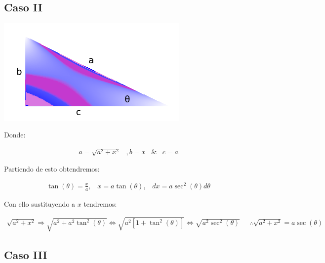 \subsection{Caso II}

\begin{center}
  \includegraphics[scale=0.5]{imgsAux/triangulo1.png}\\
\end{center}

Donde:

\begin{equation*}
    \begin{gathered}
        a=\sqrt{a^{2}+x^{2}}\;\;\;, b=x \;\;\;\&\;\;\; c=a
    \end{gathered}
\end{equation*}

Partiendo de esto obtendremos:

\begin{equation*}
    \begin{gathered}
        \tan(\theta)= \frac{x}{a},\;\;\; x=a\tan(\theta),\;\;\; dx=a\sec^{2}(\theta)d\theta
    \end{gathered}
\end{equation*}

Con ello sustituyendo a \(\displaystyle x\) tendremos:

\begin{equation*}
    \begin{gathered}
        \sqrt{a^{2}+x^{2}}\Rightarrow \sqrt{a^{2}+a^{2}\tan^{2}(\theta)} \Leftrightarrow \sqrt{a^{2}[1+\tan^{2}(\theta)]} \Leftrightarrow \sqrt{a^{2}\sec^{2}(\theta)}\;\;\;\;\; \therefore \sqrt{a^{2}+x^{2}}=a\sec(\theta)
    \end{gathered}
\end{equation*}

\clearpage
\subsection{Caso III}

